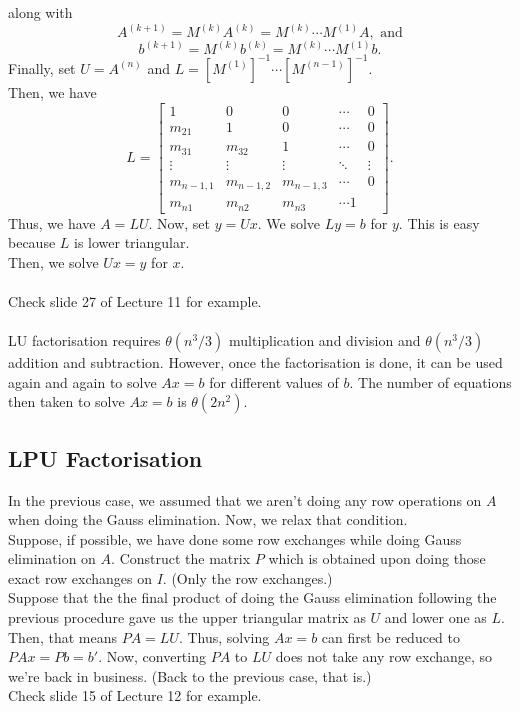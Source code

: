 \documentclass{article}
\begin{document}
along with
\[A^{(k+1)} = M^{(k)}A^{(k)} = M^{(k)}\cdots M^{(1)}A, \text{ and}\]
\[b^{(k+1)} = M^{(k)}b^{(k)} = M^{(k)}\cdots M^{(1)}b.\]
Finally, set $U = A^{(n)}$ and $L = [M^{(1)}]^{-1}\cdots \left[M^{(n-1)}\right]^{-1}.$\\
Then, we have
\[L = 
\begin{bmatrix}
	1 & 0 & 0 & \cdots & 0\\
	m_{21} & 1 & 0 & \cdots & 0\\
	m_{31} & m_{32} & 1 & \cdots & 0\\
	\vdots & \vdots & \vdots & \ddots & \vdots\\
	m_{n-1, 1} & m_{n-1, 2} & m_{n-1, 3} & \cdots & 0\\
	m_{n1} & m_{n2} & m_{n3} & \cdots 1
\end{bmatrix}.\] 
Thus, we have $A = LU.$ Now, set $y = Ux.$ We solve $Ly = b$ for $y.$ This is easy because $L$ is lower triangular.\\
Then, we solve $Ux = y$ for $x.$\\~\\
Check slide 27 of Lecture 11 for example.\\~\\
LU factorisation requires $\theta(n^3/3)$ multiplication and division and $\theta(n^3/3)$ addition and subtraction. However, once the factorisation is done, it can be used again and again to solve $Ax = b$ for different values of $b.$ The number of equations then taken to solve $Ax = b$ is $\theta(2n^2).$

\subsection{LPU Factorisation}
In the previous case, we assumed that we aren't doing any row operations on $A$ when doing the Gauss elimination. Now, we relax that condition.\\
Suppose, if possible, we have done some row exchanges while doing Gauss elimination on $A.$ Construct the matrix $P$ which is obtained upon doing those exact row exchanges on $I.$ (Only the row exchanges.)\\
Suppose that the the final product of doing the Gauss elimination following the previous procedure gave us the upper triangular matrix as $U$ and lower one as $L.$\\
Then, that means $PA = LU.$ Thus, solving $Ax = b$ can first be reduced to $PAx = Pb = b'.$ Now, converting $PA$ to $LU$ does not take any row exchange, so we're back in business. (Back to the previous case, that is.)\\
Check slide 15 of Lecture 12 for example.
\end{document}
